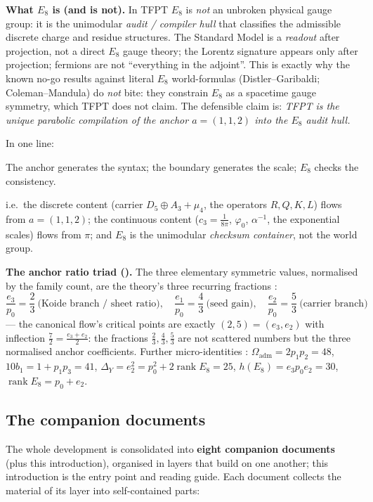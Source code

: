 \documentclass[11pt,a4paper]{article}
\newcommand{\ainv}{\alpha^{-1}}
\begin{document}
\par\smallskip
\noindent\textbf{What $E_8$ is (and is not).} In TFPT $E_8$ is \emph{not} an unbroken physical gauge group:
it is the unimodular \emph{audit / compiler hull} that classifies the admissible discrete charge and
residue structures. The Standard Model is a \emph{readout} after projection, not a direct $E_8$ gauge
theory; the Lorentz signature appears only after projection; fermions are not ``everything in the
adjoint''. This is exactly why the known no-go results against literal $E_8$ world-formulas
(Distler--Garibaldi; Coleman--Mandula) do \emph{not} bite: they constrain $E_8$ as a spacetime gauge
symmetry, which TFPT does not claim. The defensible claim is: \emph{TFPT is the unique parabolic
compilation of the anchor $a=(1,1,2)$ into the $E_8$ audit hull.}
\par\smallskip
\noindent In one line:
\begin{keyeq}
The anchor generates the syntax; the boundary generates the scale; $E_8$ checks the consistency.
\end{keyeq}
i.e.\ the discrete content (carrier $D_5\oplus A_3+\mu_4$, the operators $R,Q,K,L$) flows from
$a=(1,1,2)$; the continuous content ($c_3=\tfrac1{8\pi}$, $\varphi_0$, $\ainv$, the exponential scales) flows
from $\pi$; and $E_8$ is the unimodular \emph{checksum container}, not the world group.
\par\smallskip
\noindent\textbf{The anchor ratio triad ().} The three elementary
symmetric values, normalised by the family count, are the theory's three recurring fractions \mE:
\[
  \frac{e_3}{p_0}=\frac23\ \text{(Koide branch / sheet ratio)},\quad
  \frac{e_1}{p_0}=\frac43\ \text{(seed gain)},\quad
  \frac{e_2}{p_0}=\frac53\ \text{(carrier branch)}
\]
--- the canonical flow's critical points are exactly $(2,5)=(e_3,e_2)$ with inflection
$\tfrac72=\tfrac{e_3+e_2}2$: the fractions $\tfrac23,\tfrac43,\tfrac53$ are not scattered numbers but the
three normalised anchor coefficients. Further micro-identities \mE:
$\Omega_{\mathrm{adm}}=2p_1p_2=48$, $10b_1=1+p_1p_3=41$,
$\Delta_Y=e_2^2=p_0^2+2\operatorname{rank}E_8=25$, $h(E_8)=e_3p_0e_2=30$,
$\operatorname{rank}E_8=p_0+e_2$.

\TFPTanchorcockpit

\subsection*{The companion documents}

\noindent The whole development is consolidated into \textbf{eight companion documents} (plus
this introduction), organised in layers that build on one another; this introduction is the entry point
and reading guide. Each document collects the material of its layer into self-contained parts:
\end{document}
